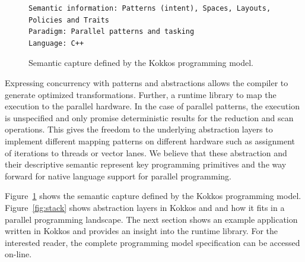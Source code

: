 \begin{figure}[h]
\begin{Verbatim}[frame=leftline]
Semantic information: Patterns (intent), Spaces, Layouts, 
Policies and Traits
Paradigm: Parallel patterns and tasking
Language: C++
\end{Verbatim}
\caption{Semantic capture defined by the Kokkos programming model.}
\label{fig:SemCaptureKokkos}
\end{figure}

Expressing concurrency with patterns and abstractions allows the compiler to generate optimized transformations. Further, a runtime library to map the execution to the parallel hardware. In the case of parallel patterns, the execution is unspecified and only promise deterministic results for the reduction and scan operations. This gives the freedom to the underlying abstraction layers to implement different mapping patterns on different hardware such as assignment of iterations to threads or vector lanes. We believe that these abstraction and their descriptive semantic represent key programming primitives and the way forward for native language support for parallel programming.

Figure~\ref{fig:SemCaptureKokkos} shows the semantic capture defined by the Kokkos programming model. 
Figure~\ref{fig:stack} shows abstraction layers in Kokkos and and how it fits in a parallel programming landscape.
The next section shows an example application written in Kokkos and provides an insight into the runtime library. For the interested reader, the complete programming model specification can be accessed on-line\cite{pub:KOKKOS}.




